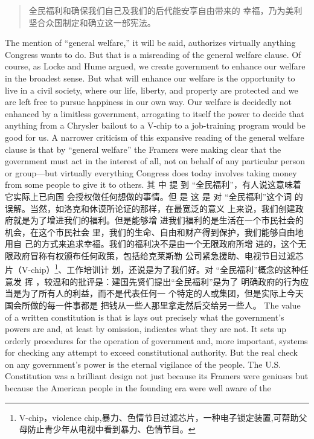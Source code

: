 \begin{paracol}{2}
\begin{quote}
全民福利和确保我们自己及我们的后代能安享自由带来的
幸福，乃为美利坚合众国制定和确立这一部宪法。
\end{quote}
\switchcolumn*
The mention of ``general welfare,'' it will be said, authorizes virtually anything Congress wants to do. But that is a misreading
of the general welfare clause. Of course, as Locke and Hume argued, we create government to enhance our welfare in the
broadest sense. But what will enhance our welfare is the opportunity to live in a civil society, where our life, liberty, and property are protected and we are left free to pursue happiness in
our own way. Our welfare is decidedly not enhanced by a limitless government, arrogating to itself the power to decide that
anything from a Chrysler bailout to a V-chip to a job-training
program would be good for us. A narrower criticism of this expansive reading of the general welfare clause is that by ``general
welfare'' the Framers were making clear that the government
must act in the interest of all, not on behalf of any particular
person or group---but virtually everything Congress does today
involves taking money from some people to give it to others.
\switchcolumn
其 中 提 到 “全民福利”，有人说这意味着它实际上已向国
会授权做任何想做的事情。但 是 这 是 对 “全民福利”这个词
的误解。当然，如洛克和休谟所论证的那样，在最宽泛的意义
上来说，我们创建政府就是为了增进我们的福利。但是能够增
进我们福利的是生活在一个市民社会的机会，在这个市民社会
里，我们的生命、自由和财产得到保护，我们能够自由地用自
己的方式来追求幸福。我们的福利决不是由一个无限政府所增
进的，这个无限政府冒称有权颁布任何政策，包括给克莱斯勒
公司紧急援助、电视节目过滤芯片（V-chip）\footnote{V-chip，violence chip,暴力、色情节目过滤芯片，一种电子锁定装置,可帮助父母防止青少年从电视中看到暴力、色情节目。}、工作培训计
划，还说是为了我们好。对 “全民福利”概念的这种任意发
挥 ，较温和的批评是：建国先贤们提出“全民福利”是为了
明确政府的行为应当是为了所有人的利益，而不是代表任何一
个特定的人或集团，但是实际上今天国会所做的每一件事都是
把钱从一些人那里拿走然后交给另一些人。
\switchcolumn*
The value of a written constitution is that is lays out precisely
what the government's powers are and, at least by omission, indicates what they are not. It sets up orderly procedures for the
operation of government and, more important, systems for
checking any attempt to exceed constitutional authority. But
the real check on any government's power is the eternal vigilance of the people. The U.S. Constitution was a brilliant design
not just because its Framers were geniuses but because the
American people in the founding era were well aware of the

\end{paracol}
